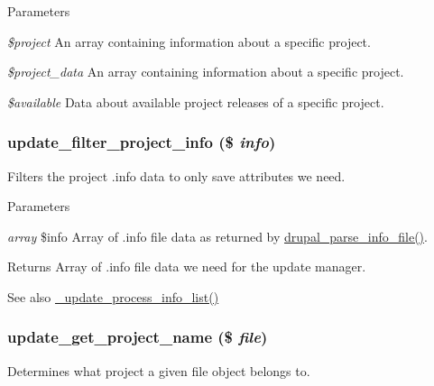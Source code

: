 \begin{DoxyParams}{Parameters}
\item[{\em \$project}]An array containing information about a specific project. \item[{\em \$project\_\-data}]An array containing information about a specific project. \item[{\em \$available}]Data about available project releases of a specific project. \end{DoxyParams}
\hypertarget{update_8compare_8inc_a8d1c29cf668adf2ea2a1a34f0f716cd1}{
\subsubsection[{update\_\-filter\_\-project\_\-info}]{\setlength{\rightskip}{0pt plus 5cm}update\_\-filter\_\-project\_\-info (\$ {\em info})}}
\label{update_8compare_8inc_a8d1c29cf668adf2ea2a1a34f0f716cd1}
Filters the project .info data to only save attributes we need.


\begin{DoxyParams}{Parameters}
\item[{\em array}]\$info Array of .info file data as returned by \hyperlink{common_8inc_a277955232059631211fcfde533ea89d6}{drupal\_\-parse\_\-info\_\-file()}.\end{DoxyParams}
\begin{DoxyReturn}{Returns}
Array of .info file data we need for the update manager.
\end{DoxyReturn}
\begin{DoxySeeAlso}{See also}
\hyperlink{update_8compare_8inc_a37eb8774bbb961b5d1113c116aba2f3b}{\_\-update\_\-process\_\-info\_\-list()} 
\end{DoxySeeAlso}
\hypertarget{update_8compare_8inc_a02c561b213ab3df2e929917736dc2b7b}{
\subsubsection[{update\_\-get\_\-project\_\-name}]{\setlength{\rightskip}{0pt plus 5cm}update\_\-get\_\-project\_\-name (\$ {\em file})}}
\label{update_8compare_8inc_a02c561b213ab3df2e929917736dc2b7b}
Determines what project a given file object belongs to.


